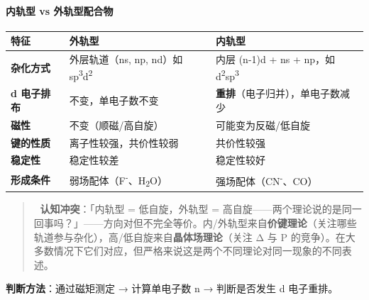 \documentclass[a4paper,11pt]{ctexart}
\newcounter{none}
\begin{document}
\paragraph{内轨型 vs 外轨型配合物}\label{ux5185ux8f68ux578b-vs-ux5916ux8f68ux578bux914dux5408ux7269}

{\def\LTcaptype{none} %
\begin{longtable}[]{@{}
  >{\raggedright\arraybackslash}p{}
  >{\raggedright\arraybackslash}p{}
  >{\raggedright\arraybackslash}p{}@{}}
\toprule\noalign{}
\begin{minipage}[b]{\linewidth}\raggedright
特征
\end{minipage} & \begin{minipage}[b]{\linewidth}\raggedright
外轨型
\end{minipage} & \begin{minipage}[b]{\linewidth}\raggedright
内轨型
\end{minipage} \\
\midrule\noalign{}
\endhead
\bottomrule\noalign{}
\endlastfoot
\textbf{杂化方式} & 外层轨道（ns, np, nd）如 sp\textsuperscript{3}d\textsuperscript{2} & 内层 (n-1)d + ns + np，如 d\textsuperscript{2}sp\textsuperscript{3} \\
\textbf{d 电子排布} & 不变，单电子数不变 & \textbf{重排}（电子归并），单电子数减少 \\
\textbf{磁性} & 不变（顺磁/高自旋） & 可能变为反磁/低自旋 \\
\textbf{键的性质} & 离子性较强，共价性较弱 & 共价性较强 \\
\textbf{稳定性} & 稳定性较差 & 稳定性较好 \\
\textbf{形成条件} & 弱场配体（F\textsuperscript{-}、H\textsubscript{2}O） & 强场配体（CN\textsuperscript{-}、CO） \\
\end{longtable}
}

\begin{quote}
🧠 \textbf{认知冲突}：「内轨型 = 低自旋，外轨型 = 高自旋------两个理论说的是同一回事吗？」------方向对但不完全等价。内/外轨型来自\textbf{价键理论}（关注哪些轨道参与杂化），高/低自旋来自\textbf{晶体场理论}（关注 Δ 与 P 的竞争）。在大多数情况下它们对应，但严格来说这是两个不同理论对同一现象的不同表述。
\end{quote}

\textbf{判断方法}：通过磁矩测定 → 计算单电子数 n → 判断是否发生 d 电子重排。
\end{document}
